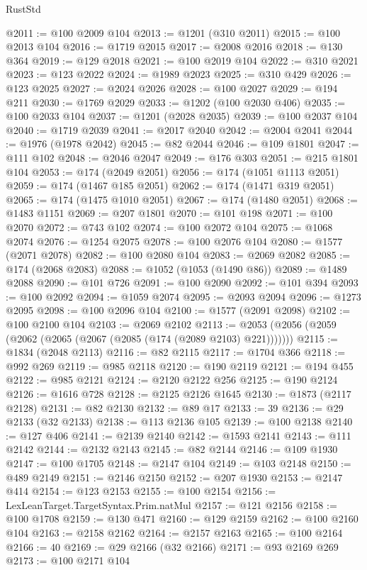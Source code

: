 \begin{lexlean}{RustStd}
\begin{coremodule}
{\begin{coremodule}
{{{{{{{{{{{{{{{{{{{{{{{{{{{{{{{{{{{{{{{{{{{{{{{{{{{{{{{@2011 := @100 @2009 @104
@2013 := @1201 (@310 @2011)
@2015 := @100 @2013 @104
@2016 := @1719 @2015
@2017 := @2008 @2016
@2018 := @130 @364
@2019 := @129 @2018
@2021 := @100 @2019 @104
@2022 := @310 @2021
@2023 := @123 @2022
@2024 := @1989 @2023
@2025 := @310 @429
@2026 := @123 @2025
@2027 := @2024 @2026
@2028 := @100 @2027
@2029 := @194 @211
@2030 := @1769 @2029
@2033 := @1202 (@100 @2030 @406)
@2035 := @100 @2033 @104
@2037 := @1201 (@2028 @2035)
@2039 := @100 @2037 @104
@2040 := @1719 @2039
@2041 := @2017 @2040
@2042 := @2004 @2041
@2044 := @1976 (@1978 @2042)
@2045 := @82 @2044
@2046 := @109 @1801
@2047 := @111 @102
@2048 := @2046 @2047
@2049 := @176 @303
@2051 := @215 @1801 @104
@2053 := @174 (@2049 @2051)
@2056 := @174 (@1051 @1113 @2051)
@2059 := @174 (@1467 @185 @2051)
@2062 := @174 (@1471 @319 @2051)
@2065 := @174 (@1475 @1010 @2051)
@2067 := @174 (@1480 @2051)
@2068 := @1483 @1151
@2069 := @207 @1801
@2070 := @101 @198
@2071 := @100 @2070
@2072 := @743 @102
@2074 := @100 @2072 @104
@2075 := @1068 @2074
@2076 := @1254 @2075
@2078 := @100 @2076 @104
@2080 := @1577 (@2071 @2078)
@2082 := @100 @2080 @104
@2083 := @2069 @2082
@2085 := @174 (@2068 @2083)
@2088 := @1052 (@1053 (@1490 @86))
@2089 := @1489 @2088
@2090 := @101 @726
@2091 := @100 @2090
@2092 := @101 @394
@2093 := @100 @2092
@2094 := @1059 @2074
@2095 := @2093 @2094
@2096 := @1273 @2095
@2098 := @100 @2096 @104
@2100 := @1577 (@2091 @2098)
@2102 := @100 @2100 @104
@2103 := @2069 @2102
@2113 := @2053 (@2056 (@2059 (@2062 (@2065 (@2067 (@2085 (@174 (@2089 @2103) @221)))))))
@2115 := @1834 (@2048 @2113)
@2116 := @82 @2115
@2117 := @1704 @366
@2118 := @992 @269
@2119 := @985 @2118
@2120 := @190 @2119
@2121 := @194 @455
@2122 := @985 @2121
@2124 := @2120 @2122 @256
@2125 := @190 @2124
@2126 := @1616 @728
@2128 := @2125 @2126 @1645
@2130 := @1873 (@2117 @2128)
@2131 := @82 @2130
@2132 := @89 @17
@2133 := 39
@2136 := @29 @2133 (@32 @2133)
@2138 := @113 @2136 @105
@2139 := @100 @2138
@2140 := @127 @406
@2141 := @2139 @2140
@2142 := @1593 @2141
@2143 := @111 @2142
@2144 := @2132 @2143
@2145 := @82 @2144
@2146 := @109 @1930
@2147 := @100 @1705
@2148 := @2147 @104
@2149 := @103 @2148
@2150 := @489 @2149
@2151 := @2146 @2150
@2152 := @207 @1930
@2153 := @2147 @414
@2154 := @123 @2153
@2155 := @100 @2154
@2156 := LexLeanTarget.TargetSyntax.Prim.natMul
@2157 := @121 @2156
@2158 := @100 @1708
@2159 := @130 @471
@2160 := @129 @2159
@2162 := @100 @2160 @104
@2163 := @2158 @2162
@2164 := @2157 @2163
@2165 := @100 @2164
@2166 := 40
@2169 := @29 @2166 (@32 @2166)
@2171 := @93 @2169 @269
@2173 := @100 @2171 @104
}}}}}}}}}}}}}}}}}}}}}}}}}}}}}}}}}}}}}}}}}}}}}}}}}}}}}}}
\end{coremodule}}
\end{coremodule}
\end{lexlean}
